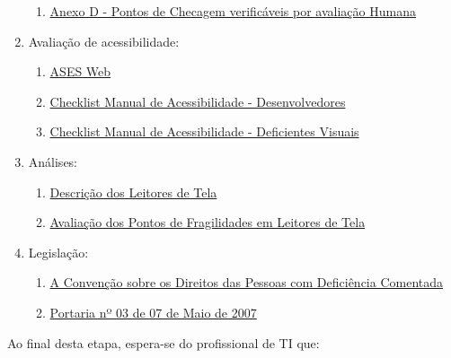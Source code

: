 \documentclass[
  12pt,
  openright,
  twoside,
  a4paper,
  english,
  french,
  spanish,
  brazil
]{abntex2}
\begin{document}
\begin{enumerate}
\begin{enumerate}
    \item \href{https://www.gov.br/governodigital/pt-br/acessibilidade-e-usuario/acessibilidade-digital/AnexoDPontosdeChecagemverificaveisporavaliacaoHumana.ods}{Anexo D - Pontos de Checagem verificáveis por avaliação Humana}
  \end{enumerate}
  \item Avaliação de acessibilidade:
  \begin{enumerate}
    \item \href{http://asesweb.governoeletronico.gov.br/ases}{ASES Web}
    \item \href{https://www.gov.br/governodigital/pt-br/acessibilidade-e-usuario/acessibilidade-digital/emag-checklist-acessibilidade-desenvolvedores.pdf}{Checklist Manual de Acessibilidade - Desenvolvedores}
    \item \href{https://www.gov.br/governodigital/pt-br/acessibilidade-e-usuario/acessibilidade-digital/emag-checklist-acessibilidade-dv.pdf}{Checklist Manual de Acessibilidade - Deficientes Visuais}
  \end{enumerate}
  \item Análises:
  \begin{enumerate}
    \item \href{https://www.gov.br/governodigital/pt-br/acessibilidade-e-usuario/acessibilidade-digital/emag-descricao-dos-leitores-de-tela.pdf}{Descrição dos Leitores de Tela}
    \item \href{https://www.gov.br/governodigital/pt-br/acessibilidade-e-usuario/acessibilidade-digital/emag-pontos-de-fragilidade-dos-leitores-de-tela.pdf}{Avaliação dos Pontos de Fragilidades em Leitores de Tela}
  \end{enumerate}
  \item Legislação:
  \begin{enumerate}
    \item \href{https://www.gov.br/governodigital/pt-br/acessibilidade-e-usuario/acessibilidade-digital/convencao-direitos-pessoas-deficiencia-comentada.pdf}{A Convenção sobre os Direitos das Pessoas com Deficiência Comentada}
    \item \href{https://www.gov.br/governodigital/pt-br/acessibilidade-e-usuario/legislacao/portaria3_eMAG.pdf}{Portaria nº 03 de 07 de Maio de 2007}
  \end{enumerate}
\end{enumerate}

Ao final desta etapa, espera-se do profissional de TI que:
\end{document}
